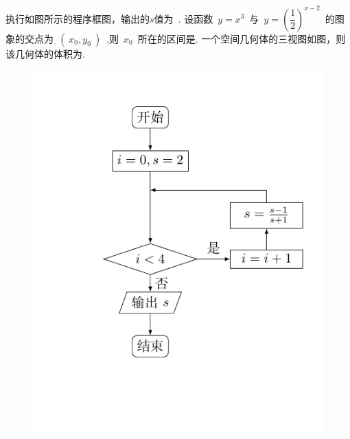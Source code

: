 \documentclass[printbox]{BHCexam}
\begin{document}
\begin{questions}
\question 执行如图所示的程序框图，输出的$s$值为~\xx.
\question 设函数~$y=x^3$~与~$y=\left(\dfrac{1}{2} \right)^{x-2}$~的图象的交点为~$(~x_0,y_0~)$~,则~$x_0$~所在的区间是\xx.
\question 一个空间几何体的三视图如图，则该几何体的体积为\xx.
\begin{figure}[!htb] 
\begin{minipage}[t]{0.5\textwidth}%
\vspace{-1cm}
\centering  
\includegraphics[scale=0.9]{liuchengtu.pdf}
\end{minipage}  
\begin{minipage}[t]{0.5\textwidth}  
\vspace{1cm}
\centering  
{}
\end{minipage}
\end{figure}
\end{questions}
\end{document}
